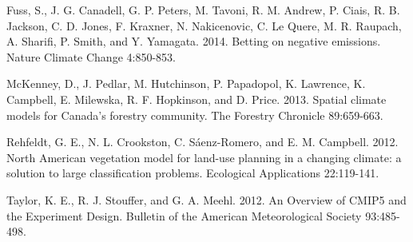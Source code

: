 \documentclass[]{article}
\begin{document}
Fuss, S., J. G. Canadell, G. P. Peters, M. Tavoni, R. M. Andrew, P.
Ciais, R. B. Jackson, C. D. Jones, F. Kraxner, N. Nakicenovic, C. Le
Quere, M. R. Raupach, A. Sharifi, P. Smith, and Y. Yamagata. 2014.
Betting on negative emissions. Nature Climate Change 4:850-853.

McKenney, D., J. Pedlar, M. Hutchinson, P. Papadopol, K. Lawrence, K.
Campbell, E. Milewska, R. F. Hopkinson, and D. Price. 2013. Spatial
climate models for Canada's forestry community. The Forestry Chronicle
89:659-663.

Rehfeldt, G. E., N. L. Crookston, C. Sáenz-Romero, and E. M. Campbell.
2012. North American vegetation model for land-use planning in a
changing climate: a solution to large classification problems.
Ecological Applications 22:119-141.

Taylor, K. E., R. J. Stouffer, and G. A. Meehl. 2012. An Overview of
CMIP5 and the Experiment Design. Bulletin of the American Meteorological
Society 93:485-498.
\end{document}
